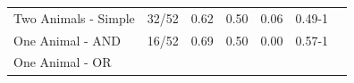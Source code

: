 \documentclass[man]{apa6}
\theoremstyle{definition}
\theoremstyle{definition}
\theoremstyle{definition}
\theoremstyle{remark}
\begin{document}
\begin{longtable}[]{@{}lllllll@{}}
\midrule
\endhead
\begin{minipage}[t]{0.23\columnwidth}\raggedright\strut
Two Animals - Simple\strut
\end{minipage} & \begin{minipage}[t]{0.19\columnwidth}\raggedright\strut
32/52\strut
\end{minipage} & \begin{minipage}[t]{0.08\columnwidth}\raggedright\strut
0.62\strut
\end{minipage} & \begin{minipage}[t]{0.08\columnwidth}\raggedright\strut
0.50\strut
\end{minipage} & \begin{minipage}[t]{0.08\columnwidth}\raggedright\strut
0.06\strut
\end{minipage} & \begin{minipage}[t]{0.08\columnwidth}\raggedright\strut
0.49-1\strut
\end{minipage} & \begin{minipage}[t]{0.08\columnwidth}\raggedright\strut
\strut
\end{minipage}\tabularnewline
\begin{minipage}[t]{0.23\columnwidth}\raggedright\strut
One Animal - AND\strut
\end{minipage} & \begin{minipage}[t]{0.19\columnwidth}\raggedright\strut
16/52\strut
\end{minipage} & \begin{minipage}[t]{0.08\columnwidth}\raggedright\strut
0.69\strut
\end{minipage} & \begin{minipage}[t]{0.08\columnwidth}\raggedright\strut
0.50\strut
\end{minipage} & \begin{minipage}[t]{0.08\columnwidth}\raggedright\strut
0.00\strut
\end{minipage} & \begin{minipage}[t]{0.08\columnwidth}\raggedright\strut
0.57-1\strut
\end{minipage} & \begin{minipage}[t]{0.08\columnwidth}\raggedright\strut
\strut
\end{minipage}\tabularnewline
\begin{minipage}[t]{0.23\columnwidth}\raggedright\strut
One Animal - OR\strut
\end{minipage} & \begin{minipage}[t]{0.19\columnwidth}\raggedright\strut

\end{minipage}
\end{longtable}
\end{document}
